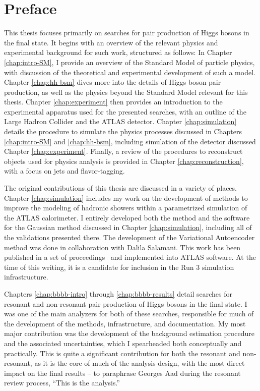 \chapter*{Preface}      %

This thesis focuses primarily on searches for pair production of Higgs bosons in the \bbbb final state. It begins 
with an overview of the relevant physics and experimental background for such work, structured as follows:
In Chapter \ref{chap:intro-SM}, I provide an overview of the Standard Model of particle physics, with discussion 
of the theoretical and experimental development of such a model. Chapter \ref{chap:hh-bsm} dives more into the 
details of Higgs boson pair production, as well as the physics beyond the Standard Model relevant for 
this thesis. Chapter \ref{chap:experiment} then provides an introduction to the experimental apparatus used for 
the presented searches, with an outline of the Large Hadron Collider and the ATLAS detector. Chapter \ref{chap:simulation} 
details the procedure to simulate the physics processes discussed in Chapters \ref{chap:intro-SM} and \ref{chap:hh-bsm}, 
including simulation of the detector discussed Chapter \ref{chap:experiment}. Finally, a review of the procedures to 
reconstruct objects used for physics analysis is provided in Chapter \ref{chap:reconstruction}, with a focus on jets and flavor-tagging.

The original contributions of this thesis are discussed in a variety of places. Chapter \ref{chap:simulation} 
includes my work on the development of methods to improve the modeling 
of hadronic showers within a parametrized simulation of the ATLAS calorimeter. I entirely developed both the method and 
the software for the Gaussian method discussed in Chapter \ref{chap:simulation}, including all of the validations 
presented there. The development of the Variational Autoencoder method was done in collaboration with Dalila Salamani. 
This work has been published in a set of proceedings~\cite{CHEP-proceedings} and implemented into ATLAS software. At the 
time of this writing, it is a candidate for inclusion in the Run 3 simulation infrastructure.

Chapters \ref{chap:bbbb-intro} through \ref{chap:bbbb-results}  detail searches for resonant 
and non-resonant pair production of Higgs bosons in the \bbbb final state. I was one of the main analyzers for both of 
these searches, responsible for much of the development of the methods, infrastructure, and documentation. 
My most major contribution was the development of the background estimation procedure and the associated uncertainties, 
which I spearheaded both conceptually and practically. This is quite a significant contribution for both the resonant and non-resonant, as it is the core of much of the analysis design, with the most direct impact on the final results -- to paraphrase Georges Aad during the resonant review process, ``This is the analysis.''


